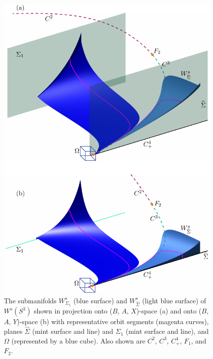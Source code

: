 \documentclass{ws-ijbc}
\begin{document}
\begin{figure}[H]
\centering
\includegraphics[]{./figures/MKMO_5.pdf}
\caption{The submanifolds $W^{s}_{\Sigma_1}$ (blue surface) and $W^{s}_{\widehat{\Sigma}}$ (light blue surface) of $W^s(S^3)$ shown in projection onto ($B$, $A$, $X$)-space (a) and onto ($B$, $A$, $Y$)-space (b) with representative orbit segments (magenta curves), planes $\widehat{\Sigma}$ (mint surface and line) and $\Sigma_1$ (mint surface and line), and $\Omega$ (represented by a blue cube).  Also shown are $C^2$, $C^3$, $C^4_+$, $F_1$, and $F_2$.}
\label{figure_5}
\end{figure}
\end{document}
